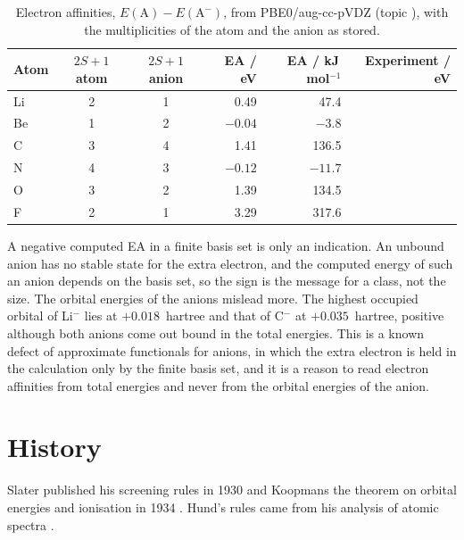 \begin{table}[htb]
	\centering\small
	\caption{Electron affinities, $E(\mathrm{A}) - E(\mathrm{A}^-)$, from PBE0/aug-cc-pVDZ (topic ), with the multiplicities of the atom and the anion as stored.}
	\label{tab:pt-ea}
	\begin{tabular}{l cc rr r}
		\hline
		Atom & $2S+1$ atom & $2S+1$ anion & EA / eV & EA / kJ\,mol$^{-1}$ & Experiment / eV \\
		\hline
		Li & 2 & 1 &  0.49 &  47.4 & \XXX \\
		Be & 1 & 2 & $-0.04$ & $-3.8$ & \XXX \\
		C  & 3 & 4 &  1.41 & 136.5 & \XXX \\
		N  & 4 & 3 & $-0.12$ & $-11.7$ & \XXX \\
		O  & 3 & 2 &  1.39 & 134.5 & \XXX \\
		F  & 2 & 1 &  3.29 & 317.6 & \XXX \\
		\hline
	\end{tabular}
\end{table}

A negative computed EA in a finite basis set is only an indication. An unbound anion has no stable state for the extra electron, and the computed energy of such an anion depends on the basis set, so the sign is the message for a class, not the size. The orbital energies of the anions mislead more. The highest occupied orbital of Li$^-$ lies at $+0.018$~hartree and that of C$^-$ at $+0.035$~hartree, positive although both anions come out bound in the total energies. This is a known defect of approximate functionals for anions, in which the extra electron is held in the calculation only by the finite basis set, and it is a reason to read electron affinities from total energies and never from the orbital energies of the anion.

\section{History}
Slater published his screening rules in 1930 \cite{slater1930} and Koopmans the theorem on orbital energies and ionisation in 1934 \cite{koopmans1934}. Hund's rules came from his analysis of atomic spectra .
